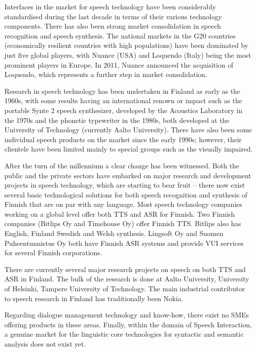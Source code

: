 \begin{multicols}{2}
Interfaces in the market for speech technology have been considerably standardised during the last decade in terms of their various technology components. There has also been strong market consolidation in speech recognition and speech synthesis. The national markets in the G20 countries (economically resilient countries with high populations) have been dominated by just five global players, with Nuance (USA) and Loquendo (Italy) being the most prominent players in Europe. In 2011, Nuance announced the acquisition of Loquendo, which represents a further step in market consolidation.

Research in speech technology has been undertaken in Finland as early as the 1960s, with some results having an international renown or impact such as the portable Synte 2 speech synthesizer, developed by the Acoustics Laboratory in the 1970s and the phonetic typewriter in the 1980s, both developed at the University of Technology (currently Aalto University). There have also been some individual speech products on the market since the early 1990s; however, their clientele have been limited mainly to special groups such as the visually impaired.

After the turn of the millennium a clear change has been witnessed.  Both the public and the private sectors have embarked on major research and development projects in speech technology, which are starting to bear fruit -- there now exist several basic technological solutions for both speech recognition and synthesis of Finnish that are on par with any language. Most speech technology companies working on a global level offer both TTS and ASR for Finnish. Two Finnish companies (Bitlips Oy and Timehouse Oy) offer Finnish TTS. Bitlips also has English, Finland Swedish and Welsh synthesis. Lingsoft Oy and Suomen Puheentunnistus Oy both have Finnish ASR systems and provide VUI services for several Finnish corporations.

There are currently several major research projects on speech on both TTS and ASR in Finland. The bulk of the research is done at Aalto University, University of Helsinki, Tampere University of Technology. The main industrial contributor to speech research in Finland has traditionally been Nokia.

Regarding dialogue management technology and know-how, there exist no SMEs offering products in these areas. Finally, within the domain of Speech Interaction, a genuine market for the linguistic core technologies for syntactic and semantic analysis does not exist yet.


\end{multicols}
